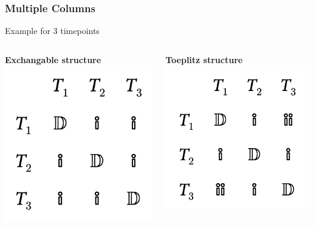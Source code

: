 \documentclass{beamer}
\begin{document}
\begin{frame}
\frametitle{Multiple Columns}
Example for 3 timepoints
\begin{columns}[c] %

\textbf{Exchangable structure}
\includegraphics[width = \textwidth]{exchangeable.png}


\textbf{Toeplitz structure}
\includegraphics[width = \textwidth]{toeplitz.png}

\end{columns}
\end{frame}
\end{document}

